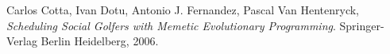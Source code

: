     Carlos Cotta, Ivan Dotu, Antonio J. Fernandez, Pascal Van Hentenryck,
    \emph{Scheduling Social Golfers with Memetic Evolutionary Programming}.
    Springer-Verlag Berlin Heidelberg,
    2006.
